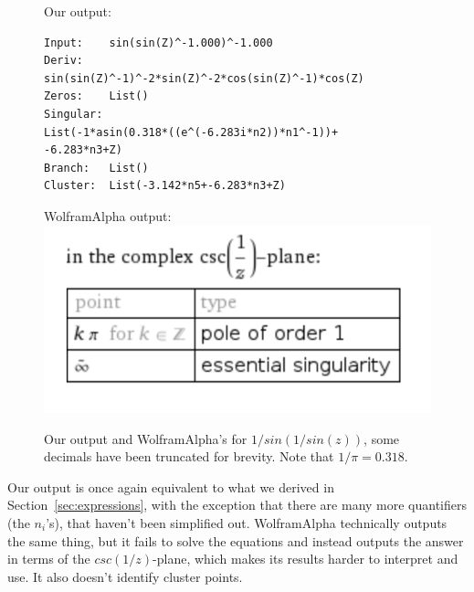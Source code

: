 \begin{figure}[H]
	\raggedright
	Our output: \\
	\begin{verbatim}
Input:    sin(sin(Z)^-1.000)^-1.000
Deriv:
sin(sin(Z)^-1)^-2*sin(Z)^-2*cos(sin(Z)^-1)*cos(Z)
Zeros:    List()
Singular:
List(-1*asin(0.318*((e^(-6.283i*n2))*n1^-1))+
-6.283*n3+Z)
Branch:   List()
Cluster:  List(-3.142*n5+-6.283*n3+Z)
	\end{verbatim} \vspace{7pt}
	WolframAlpha output:\\
	\includegraphics[width=0.6\columnwidth]{images/wpoles3}
	\caption{Our output and WolframAlpha's for $1/sin(1/sin(z))$, some decimals have been truncated for brevity. Note that $1/\pi=0.318.$}
	\label{fig:singEx2}
\end{figure}
Our output is once again equivalent to what we derived in Section~\ref{sec:expressions}, with the exception that there are many more quantifiers (the $n_i$'s), that haven't been simplified out. WolframAlpha technically outputs the same thing, but it fails to solve the equations and instead outputs the answer in terms of the $csc(1/z)$-plane, which makes its results harder to interpret and use. It also doesn't identify cluster points.
